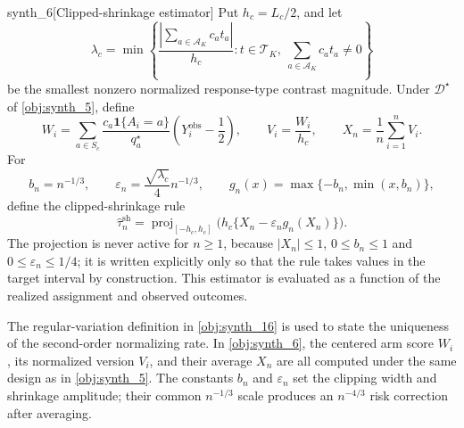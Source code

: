 \begin{definitionv}{synth_6}[Clipped-shrinkage estimator]
Put \(h_c=L_c/2\), and let
\[
\lambda_c
=
\min\left\{
\frac{\left|\sum_{a\in\mathcal A_K} c_a t_a\right|}{h_c}
:
t\in\mathcal T_K,\
\sum_{a\in\mathcal A_K} c_a t_a\neq 0
\right\}
\]
be the smallest nonzero normalized response-type contrast magnitude. Under \(\mathcal D^\star\) of \cref{obj:synth_5}, define
\[
W_i=\sum_{a\in S_c}\frac{c_a\mathbf 1\{A_i=a\}}{q_a^\star}\left(Y_i^{\mathrm{obs}}-\frac12\right),
\qquad
V_i=\frac{W_i}{h_c},
\qquad
X_n=\frac1n\sum_{i=1}^nV_i.
\]
For
\[
b_n=n^{-1/3},\qquad
\varepsilon_n=\frac{\sqrt{\lambda_c}}4n^{-1/3},\qquad
g_n(x)=\max\{-b_n,\min(x,b_n)\},
\]
define the clipped-shrinkage rule
\[
\widehat\tau_n^{\mathrm{sh}}
=\operatorname{proj}_{[-h_c,h_c]}\bigl(h_c\{X_n-\varepsilon_ng_n(X_n)\}\bigr).
\]
The projection is never active for \(n\ge1\), because \(|X_n|\le1\), \(0\le b_n\le1\) and \(0\le\varepsilon_n\le1/4\); it is written explicitly only so that the rule takes values in the target interval by construction. This estimator is evaluated as a function of the realized assignment and observed outcomes.
\end{definitionv}

The regular-variation definition in \cref{obj:synth_16} is used to state the uniqueness of the second-order normalizing rate. In \cref{obj:synth_6}, the centered arm score \(W_i\), its normalized version \(V_i\), and their average \(X_n\) are all computed under the same design as in \cref{obj:synth_5}. The constants \(b_n\) and \(\varepsilon_n\) set the clipping width and shrinkage amplitude; their common \(n^{-1/3}\) scale produces an \(n^{-4/3}\) risk correction after averaging.

